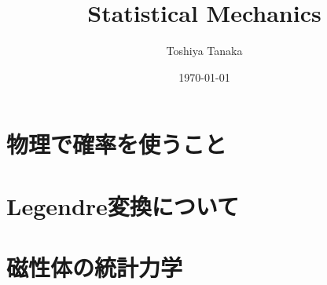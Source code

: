 \documentclass[dvipdfmx,a4paper, english]{jsreport}
\title{Statistical Mechanics}
\author{Toshiya Tanaka}
\date{\today}
\theoremstyle{break}
\numberwithin{equation}{section}
\begin{document}
\maketitle
\chapter{物理で確率を使うこと}

\chapter{Legendre変換について}

\chapter{磁性体の統計力学}


\nocite{BA88185786}


\end{document}
